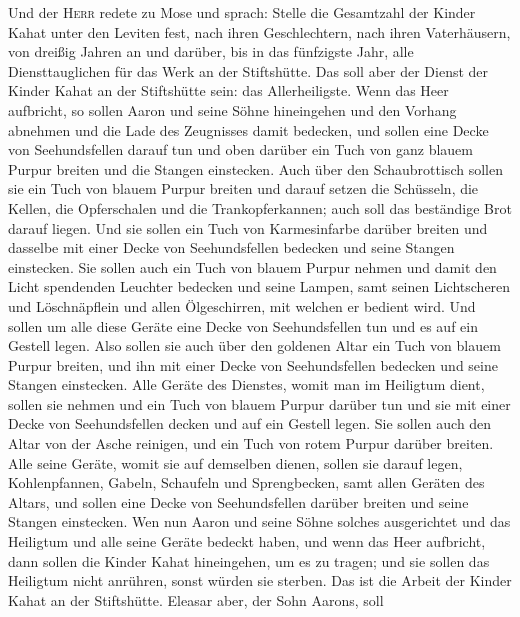  Und der \textsc{Herr} redete zu Mose und sprach: Stelle
die Gesamtzahl der Kinder Kahat unter den Leviten fest, 
nach ihren Geschlechtern, nach ihren Vaterhäusern,  von
dreißig Jahren an und darüber, bis in das fünfzigste Jahr, alle
Diensttauglichen für das Werk an der Stiftshütte.  Das
soll aber der Dienst der Kinder Kahat an der Stiftshütte sein: das
Allerheiligste.  Wenn das Heer aufbricht, so sollen Aaron
und seine Söhne hineingehen und den Vorhang abnehmen und die Lade des
Zeugnisses damit bedecken,  und sollen eine Decke von
Seehundsfellen darauf tun und oben darüber ein Tuch von ganz blauem
Purpur breiten und die Stangen einstecken.  Auch über den
Schaubrottisch sollen sie ein Tuch von blauem Purpur breiten und darauf
setzen die Schüsseln, die Kellen, die Opferschalen und die
Trankopferkannen; auch soll das beständige Brot darauf liegen.
 Und sie sollen ein Tuch von Karmesinfarbe darüber breiten
und dasselbe mit einer Decke von Seehundsfellen bedecken und seine
Stangen einstecken.  Sie sollen auch ein Tuch von blauem
Purpur nehmen und damit den Licht spendenden Leuchter bedecken und seine
Lampen, samt seinen Lichtscheren und Löschnäpflein und allen
Ölgeschirren, mit welchen er bedient wird.  Und sollen um
alle diese Geräte eine Decke von Seehundsfellen tun und es auf ein
Gestell legen.  Also sollen sie auch über den goldenen
Altar ein Tuch von blauem Purpur breiten, und ihn mit einer Decke von
Seehundsfellen bedecken und seine Stangen einstecken. 
Alle Geräte des Dienstes, womit man im Heiligtum dient, sollen sie
nehmen und ein Tuch von blauem Purpur darüber tun und sie mit einer
Decke von Seehundsfellen decken und auf ein Gestell legen.
 Sie sollen auch den Altar von der Asche reinigen, und
ein Tuch von rotem Purpur darüber breiten.  Alle seine
Geräte, womit sie auf demselben dienen, sollen sie darauf legen,
Kohlenpfannen, Gabeln, Schaufeln und Sprengbecken, samt allen Geräten
des Altars, und sollen eine Decke von Seehundsfellen darüber breiten und
seine Stangen einstecken.  Wen nun Aaron und seine Söhne
solches ausgerichtet und das Heiligtum und alle seine Geräte bedeckt
haben, und wenn das Heer aufbricht, dann sollen die Kinder Kahat
hineingehen, um es zu tragen; und sie sollen das Heiligtum nicht
anrühren, sonst würden sie sterben. Das ist die Arbeit der Kinder Kahat
an der Stiftshütte.  Eleasar aber, der Sohn Aarons, soll

